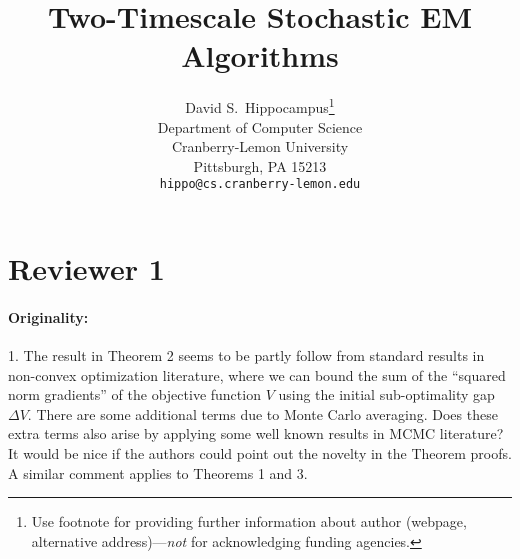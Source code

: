 \documentclass[anon,12pt]{alt2021} %
\title{Two-Timescale Stochastic EM Algorithms\vspace{-0.15in}}
\begin{document}
\maketitle


\author{%
  David S.~Hippocampus\thanks{Use footnote for providing further information
    about author (webpage, alternative address)---\emph{not} for acknowledging
    funding agencies.} \\
  Department of Computer Science\\
  Cranberry-Lemon University\\
  Pittsburgh, PA 15213 \\
  \texttt{hippo@cs.cranberry-lemon.edu} \\
}





\section{Reviewer 1}

\paragraph{Originality:}

1. The result in Theorem 2 seems to be partly follow from standard results in non-convex optimization literature, where we can bound the
sum of the ``squared norm gradients'' of the objective function $V$ using the initial sub-optimality gap $\Delta V$. There are some
additional terms due to Monte Carlo averaging. Does these extra terms also arise by applying some well known results in MCMC literature?
It would be nice if the authors could point out the novelty in the Theorem proofs. A similar comment applies to Theorems 1 and 3.
\end{document}
